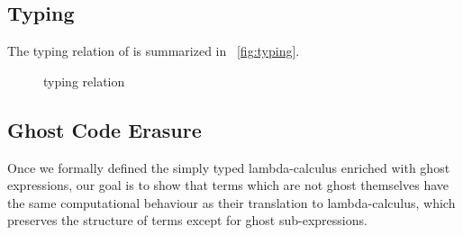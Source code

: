 \subsection{Typing}
The typing relation of \glam is summarized in ~\autoref{fig:typing}.
\begin{figure}[!h]
%	
	 \vspace*{0.4cm}
	
	\vspace*{0.4cm}
	
	\vspace*{0.4cm}
	
										{}\vspace*{0.4cm}
										
	{}
										
\caption{ \textbf{\glam  } typing relation \hfill}
\label{fig:typing}
\end{figure}




\subsection{Ghost Code Erasure}
\newcommand{\e}{\mathcal{E}}
\theoremstyle{remark}
\newtheorem{dfn}[theorem]{Definition}

\qquad Once we formally defined the simply typed lambda-calculus enriched with ghost expressions, our goal is to show that terms which are not ghost 
themselves have the same computational behaviour as their translation to
lambda-calculus, which preserves the structure of terms except for ghost sub-expressions. 

